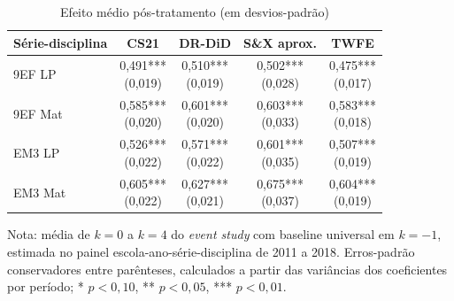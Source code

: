\begin{table}[htbp]
\centering
\caption{Efeito médio pós-tratamento (em desvios-padrão)}
\label{tab:eventstudy_principal}
\begin{tabular}{lcccc}
\toprule
Série-disciplina & CS21 & DR-DiD & S\&X aprox. & TWFE \\
\midrule
9EF LP & \makecell{0,491***\\(0,019)} & \makecell{0,510***\\(0,019)} & \makecell{0,502***\\(0,028)} & \makecell{0,475***\\(0,017)} \\
9EF Mat & \makecell{0,585***\\(0,020)} & \makecell{0,601***\\(0,020)} & \makecell{0,603***\\(0,033)} & \makecell{0,583***\\(0,018)} \\
EM3 LP & \makecell{0,526***\\(0,022)} & \makecell{0,571***\\(0,022)} & \makecell{0,601***\\(0,035)} & \makecell{0,507***\\(0,019)} \\
EM3 Mat & \makecell{0,605***\\(0,022)} & \makecell{0,627***\\(0,021)} & \makecell{0,675***\\(0,037)} & \makecell{0,604***\\(0,019)} \\
\bottomrule
\end{tabular}
\vspace{0.2cm}
\begin{flushleft}
\footnotesize Nota: média de \(k=0\) a \(k=4\) do \textit{event study} com baseline universal em \(k=-1\), estimada no painel escola-ano-série-disciplina de 2011 a 2018. Erros-padrão conservadores entre parênteses, calculados a partir das variâncias dos coeficientes por período; * \(p<0{,}10\), ** \(p<0{,}05\), *** \(p<0{,}01\).
\end{flushleft}
\end{table}
